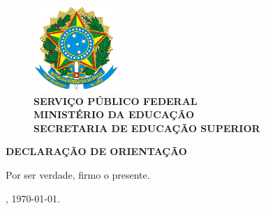\newpage

\vspace*{-2.5cm}

\begin{figure}[!htbp]
	\centering
	\includegraphics[width=3.25cm]{./figuras/brasao.eps}\\
	\small{\textbf{SERVIÇO PÚBLICO FEDERAL}}\\
	\textbf{MINISTÉRIO DA EDUCAÇÃO}\\
	\textbf{SECRETARIA DE EDUCAÇÃO SUPERIOR}\\
	\MakeUppercase{\textbf{\universidade}}
\end{figure}

\vspace{2cm}

\begin{center}
	\textbf{\Large{\MakeUppercase{Declaração de Orientação}}}
\end{center}

\vspace{2cm}

	
\noindent Por ser verdade, firmo o presente.

\vspace{1cm}

\noindent\imprimirlocal, \today.


\begin{center}
\end{center}

\newpage